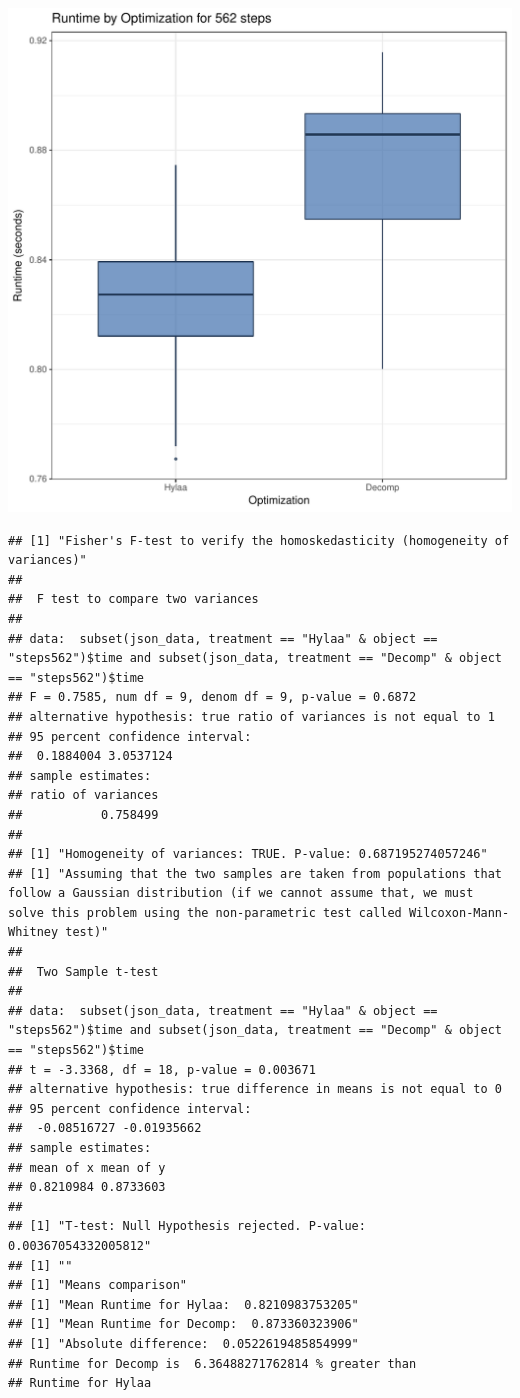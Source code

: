 \documentclass{article}\usepackage[]{graphicx}\usepackage[]{color}
\makeatletter
\def\maxwidth{ %
  \ifdim\Gin@nat@width>\linewidth
    \linewidth
  \else
    \Gin@nat@width
  \fi
}
\newenvironment{kframe}{%
 \def\at@end@of@kframe{}%
 \ifinner\ifhmode%
  \def\at@end@of@kframe{\end{minipage}}%
  \begin{minipage}{\columnwidth}%
 \fi\fi%
 \def\FrameCommand##1{\hskip\@totalleftmargin \hskip-\fboxsep
 \colorbox{shadecolor}{##1}\hskip-\fboxsep
     \hskip-\linewidth \hskip-\@totalleftmargin \hskip\columnwidth}%
 \MakeFramed {\advance\hsize-\width
   \@totalleftmargin\z@ \linewidth\hsize
   \@setminipage}}%
 {\par\unskip\endMakeFramed%
 \at@end@of@kframe}
\newenvironment{knitrout}{}{} %
\makeatother
\begin{document}
\begin{knitrout}
\color{fgcolor}
\includegraphics[width=\maxwidth]{figure/RH2_steps562-1} 
\begin{kframe}\begin{verbatim}
## [1] "Fisher's F-test to verify the homoskedasticity (homogeneity of variances)"
## 
## 	F test to compare two variances
## 
## data:  subset(json_data, treatment == "Hylaa" & object == "steps562")$time and subset(json_data, treatment == "Decomp" & object == "steps562")$time
## F = 0.7585, num df = 9, denom df = 9, p-value = 0.6872
## alternative hypothesis: true ratio of variances is not equal to 1
## 95 percent confidence interval:
##  0.1884004 3.0537124
## sample estimates:
## ratio of variances 
##           0.758499 
## 
## [1] "Homogeneity of variances: TRUE. P-value: 0.687195274057246"
## [1] "Assuming that the two samples are taken from populations that follow a Gaussian distribution (if we cannot assume that, we must solve this problem using the non-parametric test called Wilcoxon-Mann-Whitney test)"
## 
## 	Two Sample t-test
## 
## data:  subset(json_data, treatment == "Hylaa" & object == "steps562")$time and subset(json_data, treatment == "Decomp" & object == "steps562")$time
## t = -3.3368, df = 18, p-value = 0.003671
## alternative hypothesis: true difference in means is not equal to 0
## 95 percent confidence interval:
##  -0.08516727 -0.01935662
## sample estimates:
## mean of x mean of y 
## 0.8210984 0.8733603 
## 
## [1] "T-test: Null Hypothesis rejected. P-value: 0.00367054332005812"
## [1] ""
## [1] "Means comparison"
## [1] "Mean Runtime for Hylaa:  0.8210983753205"
## [1] "Mean Runtime for Decomp:  0.873360323906"
## [1] "Absolute difference:  0.0522619485854999"
## Runtime for Decomp is  6.36488271762814 % greater than 
## Runtime for Hylaa
\end{verbatim}
\end{kframe}
\end{knitrout}
\end{document}
